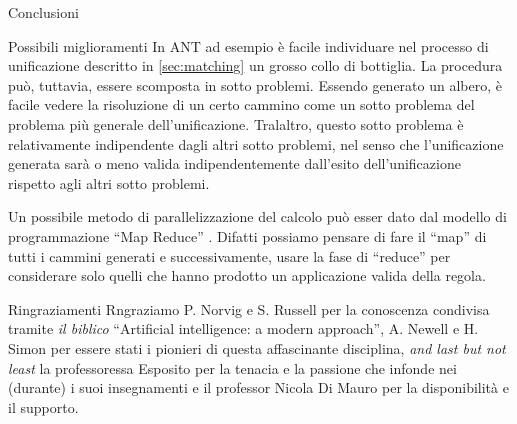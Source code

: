 \begin{chapter}{Conclusioni}
\begin{section}{Possibili miglioramenti}
In ANT ad esempio \`e facile individuare nel processo di unificazione descritto in
\ref{sec:matching} un grosso collo di bottiglia. La procedura pu\`o, tuttavia,
essere scomposta in sotto problemi. Essendo generato un albero, \`e facile vedere
la risoluzione di un certo cammino come un sotto problema del problema pi\`u generale
dell'unificazione. Tralaltro, questo sotto problema \`e relativamente indipendente
dagli altri sotto problemi, nel senso che l'unificazione generata sar\`a o meno valida
indipendentemente dall'esito dell'unificazione rispetto agli altri sotto problemi.

Un possibile metodo di parallelizzazione del calcolo pu\`o esser dato dal modello di
programmazione ``Map Reduce'' \cite{mapreduce-osdi}. Difatti possiamo pensare di
fare il ``map'' di tutti i cammini generati e successivamente, usare la fase di
``reduce'' per considerare solo quelli che hanno prodotto un applicazione valida
della regola.
\end{section}

\begin{section}{Ringraziamenti}
Rngraziamo P. Norvig e S. Russell per la conoscenza condivisa tramite \textit {il biblico}
``Artificial intelligence: a modern approach'',  A. Newell e H. Simon per essere stati i
pionieri di questa affascinante disciplina, \textit{and last but not least} la professoressa
Esposito per la tenacia e la passione che infonde nei (durante) i suoi insegnamenti e il
professor Nicola Di Mauro per la disponibilit\`a e il supporto. 
\end{section}	
\end{chapter}
